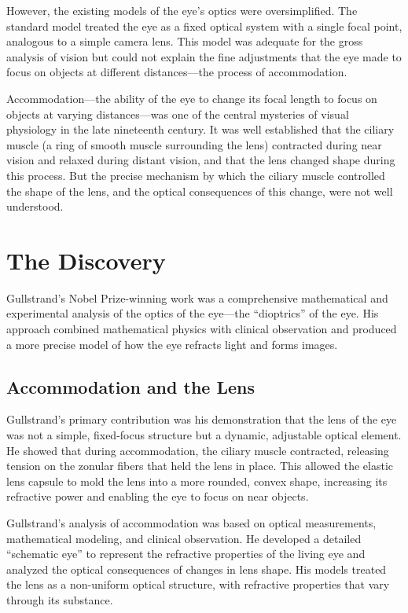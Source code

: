However, the existing models of the eye's optics were oversimplified. The standard model treated the eye as a fixed optical system with a single focal point, analogous to a simple camera lens. This model was adequate for the gross analysis of vision but could not explain the fine adjustments that the eye made to focus on objects at different distances---the process of accommodation.

Accommodation---the ability of the eye to change its focal length to focus on objects at varying distances---was one of the central mysteries of visual physiology in the late nineteenth century. It was well established that the ciliary muscle (a ring of smooth muscle surrounding the lens) contracted during near vision and relaxed during distant vision, and that the lens changed shape during this process. But the precise mechanism by which the ciliary muscle controlled the shape of the lens, and the optical consequences of this change, were not well understood.

\section{The Discovery}

Gullstrand's Nobel Prize-winning work was a comprehensive mathematical and experimental analysis of the optics of the eye---the ``dioptrics'' of the eye. His approach combined mathematical physics with clinical observation and produced a more precise model of how the eye refracts light and forms images.\cite{gullstrand-biographical,lecture-1911}

\subsection{Accommodation and the Lens}

Gullstrand's primary contribution was his demonstration that the lens of the eye was not a simple, fixed-focus structure but a dynamic, adjustable optical element. He showed that during accommodation, the ciliary muscle contracted, releasing tension on the zonular fibers that held the lens in place. This allowed the elastic lens capsule to mold the lens into a more rounded, convex shape, increasing its refractive power and enabling the eye to focus on near objects.

Gullstrand's analysis of accommodation was based on optical measurements, mathematical modeling, and clinical observation. He developed a detailed ``schematic eye'' to represent the refractive properties of the living eye and analyzed the optical consequences of changes in lens shape. His models treated the lens as a non-uniform optical structure, with refractive properties that vary through its substance.\cite{gullstrand-biographical,lecture-1911}

